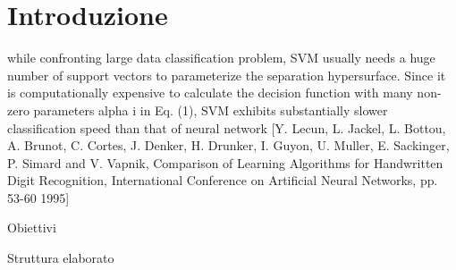 \chapter{Introduzione}
\label{chap:introduzione}

while
confronting large data classification problem, SVM usually needs a huge number of
support vectors to parameterize the separation hypersurface. Since it is computationally
expensive to calculate the decision function with many non-zero parameters alpha i in Eq.
(1), SVM exhibits substantially slower classification speed than that of neural network
[Y. Lecun, L. Jackel, L. Bottou, A. Brunot, C. Cortes, J. Denker, H. Drunker, I. Guyon, U.
Muller, E. Sackinger, P. Simard and V. Vapnik, 
Comparison of Learning Algorithms for Handwritten Digit Recognition, 
International Conference on Artificial Neural Networks,
pp. 53-60 1995]


Obiettivi

Struttura elaborato
